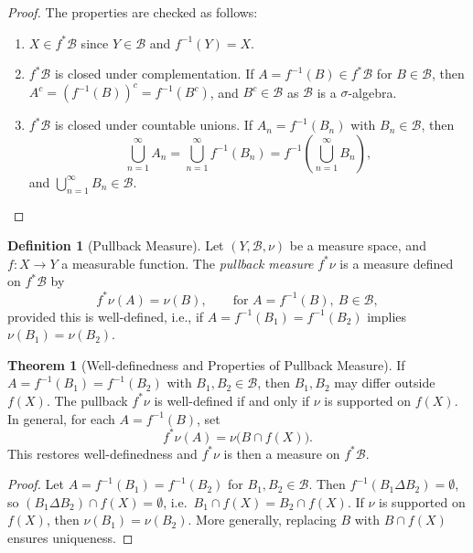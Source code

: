\documentclass[12pt]{article}
\theoremstyle{definition}
\newtheorem{definition}{Definition}[section]
\newtheorem{theorem}{Theorem}[section]
\begin{document}
\begin{proof}
The properties are checked as follows:
\begin{enumerate}
    \item $X \in f^{*}\mathscr{B}$ since $Y \in \mathscr{B}$ and $f^{-1}(Y) = X$.
    \item $f^{*}\mathscr{B}$ is closed under complementation. If $A = f^{-1}(B) \in f^{*}\mathscr{B}$ for $B \in \mathscr{B}$, then $A^{c} = (f^{-1}(B))^{c} = f^{-1}(B^{c})$, and $B^{c} \in \mathscr{B}$ as $\mathscr{B}$ is a $\sigma$-algebra.
    \item $f^{*}\mathscr{B}$ is closed under countable unions. If $A_n = f^{-1}(B_n)$ with $B_n \in \mathscr{B}$, then
    \[
    \bigcup_{n=1}^{\infty} A_n = \bigcup_{n=1}^{\infty} f^{-1}(B_n) = f^{-1}\left( \bigcup_{n=1}^{\infty} B_n \right), 
    \]
    and $\bigcup_{n=1}^\infty B_n \in \mathscr{B}$.
\end{enumerate}
\end{proof}

\begin{definition}[Pullback Measure]
Let $(Y, \mathscr{B}, \nu)$ be a measure space, and $f: X \to Y$ a measurable function. The \textit{pullback measure} $f^{*}\nu$ is a measure defined on $f^{*}\mathscr{B}$ by
\[
f^{*}\nu(A) = \nu(B), \qquad \text{for }A = f^{-1}(B),\ B \in \mathscr{B},
\]
provided this is well-defined, i.e., if $A = f^{-1}(B_1) = f^{-1}(B_2)$ implies $\nu(B_1) = \nu(B_2)$.
\end{definition}

\begin{theorem}[Well-definedness and Properties of Pullback Measure]
If $A = f^{-1}(B_1) = f^{-1}(B_2)$ with $B_1,B_2 \in \mathscr{B}$, then $B_1, B_2$ may differ outside $f(X)$. The pullback $f^{*}\nu$ is well-defined if and only if $\nu$ is supported on $f(X)$. In general, for each $A = f^{-1}(B)$, set
\[
f^{*}\nu(A) = \nu\big( B \cap f(X) \big).
\]
This restores well-definedness and $f^{*}\nu$ is then a measure on $f^{*}\mathscr{B}$.
\end{theorem}

\begin{proof}
Let $A = f^{-1}(B_1) = f^{-1}(B_2)$ for $B_1, B_2 \in \mathscr{B}$. Then $f^{-1}(B_1 \Delta B_2) = \emptyset$, so $(B_1 \Delta B_2) \cap f(X) = \emptyset$, i.e.\ $B_1 \cap f(X) = B_2 \cap f(X)$. If $\nu$ is supported on $f(X)$, then $\nu(B_1) = \nu(B_2)$. More generally, replacing $B$ with $B \cap f(X)$ ensures uniqueness.
\end{proof}
\end{document}

